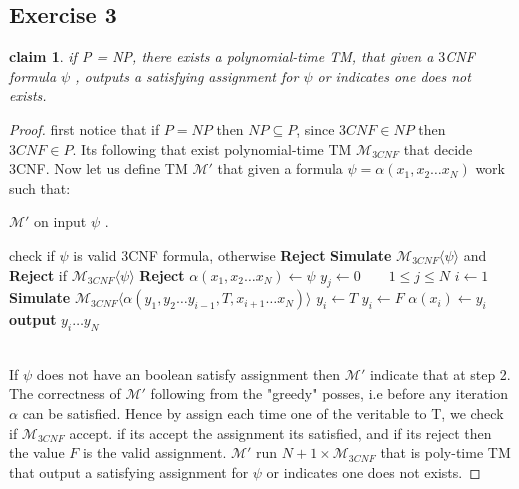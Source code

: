 \documentclass[12pt]{article}
\newtheorem*{claim*}{claim}
\begin{document}
\subsection{Exercise 3} \begin{claim*} if P = NP, there exists a polynomial-time TM, that given a
$3$CNF formula $\psi$ , outputs a satisfying assignment for $\psi$  or indicates one does
not exists.
\end{claim*}
\begin{proof}
first notice that if $P=NP$ then $NP\subseteq P$, since $3CNF\in NP$ then $3CNF\in P$. Its following that exist  polynomial-time TM $\mathcal{M}_{3CNF}$ that decide 3CNF.  Now let us define TM $\mathcal{M'}$ that given  a formula $\psi=\alpha(x_1,x_2\dots x_N)$ work such that:
\begin{algorithm}
\caption{ $\mathcal{M}'$ on input $\psi$ .}\label{alg:cap}
\begin{algorithmic} 
\State  check if   $\psi$ is valid 3CNF formula, otherwise \textbf{Reject}
\State \textbf{Simulate} $\mathcal{M}_{3CNF}\langle \psi\rangle$ and
\textbf{Reject} if $\mathcal{M}_{3CNF}\langle\psi\rangle$  \textbf{Reject}
\State $\alpha(x_1,x_2\dots x_N)\gets \psi$
\State $ y_j\gets 0 \quad  \quad 1\le j \le N$
\State $i\gets 1$
\State \textbf{Simulate} $\mathcal{M}_{3CNF}\langle\alpha(y_1,y_2\dots y_{i-1}, T, x_{i+1}\dots  x_N)\rangle$
\State $y_i \gets T$
\Else{}
\State $y_i\gets F$
\EndIf
\State $\alpha(x_i)\gets y_i$
\EndWhile
\State  \textbf{output} $y_i\dots y_N$
\end{algorithmic}
\end{algorithm}\\
If $\psi$ does not have an boolean satisfy assignment then $\mathcal{M}'$ indicate that at step 2. 
The correctness of $\mathcal{M}'$ following from the "greedy" posses, i.e before any iteration $\alpha$ can be satisfied. Hence by assign each time one of the veritable to T, we check if $\mathcal{M}_{3CNF}$ accept. if its accept the assignment its satisfied, and if its reject  then the value $F$    is the valid assignment. $\mathcal{M}'$ run $N+1 \times \mathcal{M}_{3CNF}$ that is poly-time TM that output a satisfying assignment for $\psi$  or indicates one does not exists.

\end{proof}
\end{document}
